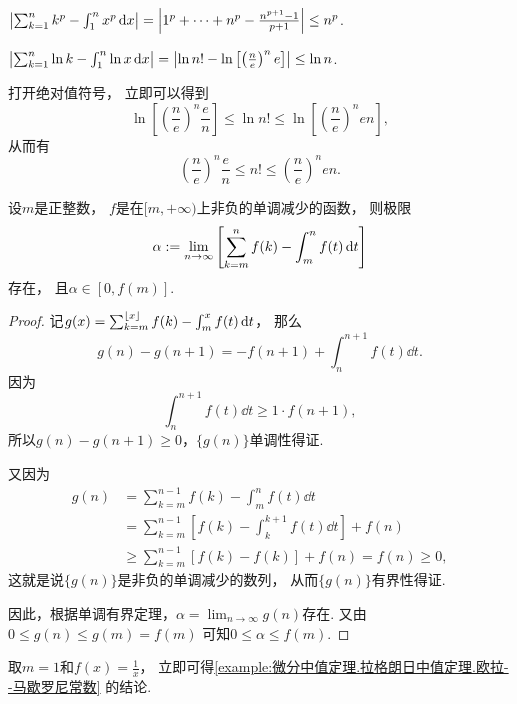 \begin{example}
\(\abs{\sum_{k=1}^n k^p - \int_1^n x^p \dd{x}}
= \abs{1^p+\dotsb+n^p - \frac{n^{p+1}-1}{p+1}}
\leq n^p\).
\end{example}

\begin{example}
\(\abs{\sum_{k=1}^n \ln k - \int_1^n \ln x \dd{x}}
= \abs{\ln n! - \ln\left[\left(\frac{n}{e}\right)^n e\right]}
\leq \ln n\).
\end{example}
\begin{remark}
打开绝对值符号，
立即可以得到\begin{equation*}
	\ln\left[\left(\frac{n}{e}\right)^n \frac{e}{n}\right]
	\leq \ln n!
	\leq \ln\left[\left(\frac{n}{e}\right)^n e n\right],
\end{equation*}
从而有\begin{equation*}
	\left(\frac{n}{e}\right)^n \frac{e}{n}
	\leq n!
	\leq \left(\frac{n}{e}\right)^n e n.
\end{equation*}
\end{remark}

\begin{theorem}
设\(m\)是正整数，
\(f\)是在\([m,+\infty)\)上非负的单调减少的函数，
则极限\begin{equation*}
	\alpha
	:=
	\lim_{n\to\infty} \left[
		\sum_{k=m}^n f(k)
		- \int_m^n f(t) \dd{t}
	\right]
\end{equation*}存在，
且\(\alpha\in[0,f(m)]\).
\begin{proof}
记\(g(x)
= \sum_{k=m}^{\lfloor x\rfloor} f(k)
- \int_m^x f(t) \dd{t}\)，
那么\begin{equation*}
	g(n) - g(n+1)
	= -f(n+1)
	+ \int_n^{n+1} f(t) \dd{t}.
\end{equation*}
因为\begin{equation*}
	\int_n^{n+1} f(t) \dd{t}
	\geq
	1 \cdot f(n+1),
\end{equation*}
所以\(g(n) - g(n+1) \geq 0\)，\(\{g(n)\}\)单调性得证.

又因为\begin{align*}
	g(n)
	&= \sum_{k=m}^{n-1} f(k) - \int_m^n f(t) \dd{t} \\
	&= \sum_{k=m}^{n-1} \left[
			f(k) - \int_k^{k+1} f(t) \dd{t}
		\right] + f(n) \\
	&\geq \sum_{k=m}^{n-1} [f(k) - f(k)] + f(n)
	= f(n) \geq 0,
\end{align*}
这就是说\(\{g(n)\}\)是非负的单调减少的数列，
从而\(\{g(n)\}\)有界性得证.

因此，根据单调有界定理，\(\alpha = \lim_{n\to\infty} g(n)\)存在.
又由\(0 \leq g(n) \leq g(m) = f(m)\)
可知\(0 \leq \alpha \leq f(m)\).
\end{proof}
\end{theorem}
\begin{remark}
取\(m=1\)和\(f(x) = \frac1x\)，
立即可得\cref{example:微分中值定理.拉格朗日中值定理.欧拉--马歇罗尼常数} 的结论.
\end{remark}

